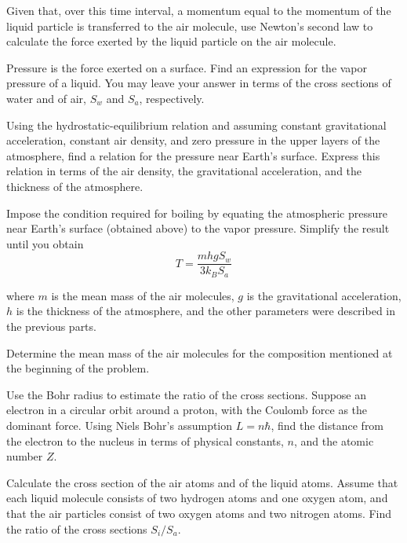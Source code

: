 \documentclass[11pt]{article}
\begin{document}
\begin{pproblem}
\begin{alternativas}
Given that, over this time interval, a momentum equal to the momentum of the liquid particle is transferred to the air molecule, use Newton's second law to calculate the force exerted by the liquid particle on the air molecule.

\item Pressure is the force exerted on a surface. Find an expression for the vapor pressure of a liquid. You may leave your answer in terms of the cross sections of water and of air, \(S_w\) and \(S_a\), respectively.

\item Using the hydrostatic-equilibrium relation and assuming constant gravitational acceleration, constant air density, and zero pressure in the upper layers of the atmosphere, find a relation for the pressure near Earth's surface. Express this relation in terms of the air density, the gravitational acceleration, and the thickness of the atmosphere.

\item Impose the condition required for boiling by equating the atmospheric pressure near Earth's surface (obtained above) to the vapor pressure. Simplify the result until you obtain
\begin{equation}
    T = \frac{mhg S_w}{3k_B S_a}
\end{equation}

where $m$ is the mean mass of the air molecules, $g$ is the gravitational acceleration, $h$ is the thickness of the atmosphere, and the other parameters were described in the previous parts.

\item Determine the mean mass of the air molecules for the composition mentioned at the beginning of the problem.

\item Use the Bohr radius to estimate the ratio of the cross sections. Suppose an electron in a circular orbit around a proton, with the Coulomb force as the dominant force. Using Niels Bohr's assumption $L = n\hbar$, find the distance from the electron to the nucleus in terms of physical constants, $n$, and the atomic number $Z$.

\item Calculate the cross section of the air atoms and of the liquid atoms. Assume that each liquid molecule consists of two hydrogen atoms and one oxygen atom, and that the air particles consist of two oxygen atoms and two nitrogen atoms. Find the ratio of the cross sections $S_i/S_a$.


\end{alternativas}
\end{pproblem}
\end{document}
